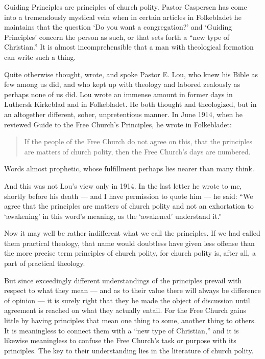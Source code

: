 Guiding Principles are principles of church polity. Pastor Caspersen has come into a tremendously mystical vein when in certain articles in Folkebladet he maintains that the question ‘Do you want a congregation?’ and ‘Guiding Principles’ concern the person as such, or that sets forth a “new type of Christian.” It is almost incomprehensible that a man with theological formation can write such a thing.

Quite otherwise thought, wrote, and spoke Pastor E. Lou, who knew his Bible as few among us did, and who kept up with theology and labored zealously as perhaps none of us did. Lou wrote an immense amount in former days in Luthersk Kirkeblad and in Folkebladet. He both thought and theologized, but in an altogether different, sober, unpretentious manner. In June 1914, when he reviewed Guide to the Free Church’s Principles, he wrote in Folkebladet:


\begin{quote}
If the people of the Free Church do not agree on this, that the principles are matters of church polity, then the Free Church’s days are numbered.
\end{quote}

Words almost prophetic, whose fulfillment perhaps lies nearer than many think.

And this was not Lou’s view only in 1914. In the last letter he wrote to me, shortly before his death — and I have permission to quote him — he said: “We agree that the principles are matters of church polity and not an exhortation to ‘awakening’ in this word’s meaning, as the ‘awakened’ understand it.”

Now it may well be rather indifferent what we call the principles. If we had called them practical theology, that name would doubtless have given less offense than the more precise term principles of church polity, for church polity is, after all, a part of practical theology.

But since exceedingly different understandings of the principles prevail with respect to what they mean — and as to their value there will always be difference of opinion — it is surely right that they be made the object of discussion until agreement is reached on what they actually entail. For the Free Church gains little by having principles that mean one thing to some, another thing to others. It is meaningless to connect them with a “new type of Christian,” and it is likewise meaningless to confuse the Free Church’s task or purpose with its principles. The key to their understanding lies in the literature of church polity.

